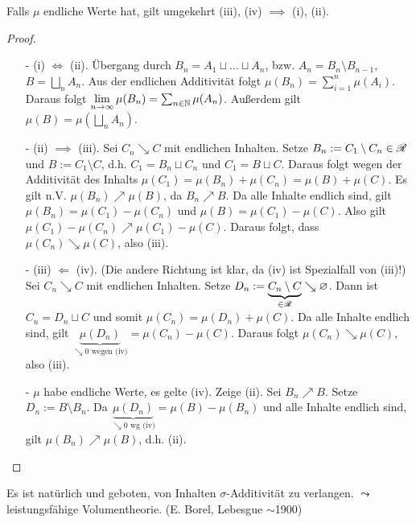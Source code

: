 \begin{proposition}
\begin{mdframed}
\begin{enumerate}[(\roman*),topsep=5pt, itemsep = 0 pt]
	\end{enumerate}
	Falls $\mu$ endliche Werte hat, gilt umgekehrt (iii), (iv) $\implies$ (i), (ii).
\end{mdframed}
\begin{proof}\
\begin{enumerate}[(\roman*),topsep=5pt, itemsep = 0 pt]
	\item[-] (i) $\iff$ (ii). Übergang durch $B_n = A_1 \sqcup ... \sqcup A_n$, bzw. $A_n = B_n \setminus B_{n-1}$, $B = \bigsqcup_n A_n$. Aus der endlichen Additivität folgt $\mu (B_n) = \sum_{i=1}^n \mu(A_i)$. Daraus folgt $\lim\limits_{n \to \infty} \mu (B_n) = \sum_{n \in \mathbb{N}} \mu (A_n)$. Außerdem gilt $\mu(B) = \mu (\bigsqcup_n A_n)$. \checkmark
	\item[-] (ii) $\implies$ (iii). Sei $C_n \searrow C$ mit endlichen Inhalten. Setze $B_n := C_1 \setminus C_n \in \mathscr{R}$ und $B := C_1 \setminus C$, d.h. $C_1 = B_n \sqcup C_n$ und $C_1 = B \sqcup C$. Daraus folgt wegen der Additivität des Inhalts $\mu(C_1) = \mu (B_n) + \mu(C_n)=\mu(B) + \mu (C)$. Es gilt n.V. $\mu(B_n) \nearrow \mu (B)$, da $B_n \nearrow B$. Da alle Inhalte endlich sind, gilt
		$\mu (B_n) = \mu(C_1) - \mu (C_n)$ und
		$\mu (B) = \mu(C_1) - \mu (C)$. Also gilt $\mu(C_1) - \mu (C_n) \nearrow \mu(C_1) - \mu (C)$.
	Daraus folgt, dass $\mu(C_n) \searrow \mu(C)$, also (iii).
	\item[-] (iii) $\Longleftarrow$ (iv).  (Die andere Richtung ist klar, da (iv) ist Spezialfall von (iii)!) \newline
	Sei $C_n \searrow C$ mit endlichen Inhalten. Setze $D_n := \underbrace{C_n \setminus C}_{\in \mathscr{R}} \searrow \varnothing$. Dann ist $C_n = D_n \sqcup C$ und somit $\mu(C_n) = \mu(D_n) + \mu(C)$. Da alle Inhalte endlich sind, gilt $\underbrace{\mu(D_n)}_{\searrow 0 \text{ wegen (iv)}} = \mu(C_n) -\mu (C)$. Daraus folgt $\mu(C_n) \searrow \mu (C)$, also (iii).
	\item[-] $\mu$ habe endliche Werte, es gelte (iv). Zeige (ii). Sei $B_n \nearrow B$. Setze $D_n:=B \setminus B_n$. Da $\underbrace{\mu(D_n)}_{\searrow 0 \text{ wg (iv)}} = \mu(B) - \mu (B_n)$ und alle Inhalte endlich sind, gilt $\mu(B_n) \nearrow \mu(B)$, d.h. (ii).
\end{enumerate}
\end{proof}
\end{proposition}


Es ist natürlich und geboten, von Inhalten $\sigma$-Additivität zu verlangen. $\leadsto$ leistungsfähige Volumentheorie. (E. Borel, Lebesgue $\sim$1900)

